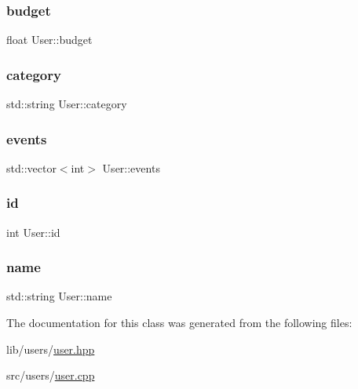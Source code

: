 \subsubsection{\texorpdfstring{budget}{budget}}
{\footnotesize\ttfamily float User\+::budget\hspace{0.3cm}{\ttfamily [protected]}}

\mbox{\label{class_user_a4216a4a01d8b3b036de85c5238d79cea}} 
\subsubsection{\texorpdfstring{category}{category}}
{\footnotesize\ttfamily std\+::string User\+::category\hspace{0.3cm}{\ttfamily [protected]}}

\mbox{\label{class_user_a8c39751ae4641cbfea8c058a439e2cba}} 
\subsubsection{\texorpdfstring{events}{events}}
{\footnotesize\ttfamily std\+::vector$<$int$>$ User\+::events\hspace{0.3cm}{\ttfamily [protected]}}

\mbox{\label{class_user_aa7e6e39b43020bbe9c3a196b3689b0f7}} 
\subsubsection{\texorpdfstring{id}{id}}
{\footnotesize\ttfamily int User\+::id\hspace{0.3cm}{\ttfamily [protected]}}

\mbox{\label{class_user_a085d8d69282b6298964eab8351584536}} 
\subsubsection{\texorpdfstring{name}{name}}
{\footnotesize\ttfamily std\+::string User\+::name\hspace{0.3cm}{\ttfamily [protected]}}



The documentation for this class was generated from the following files\+:\begin{DoxyCompactItemize}
\item 
lib/users/\hyperlink{user_8hpp}{user.\+hpp}\item 
src/users/\hyperlink{user_8cpp}{user.\+cpp}\end{DoxyCompactItemize}
